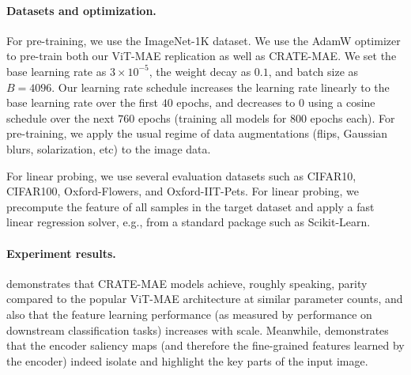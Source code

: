 \documentclass[\toplevelprefix/book-main.tex]{subfiles}
\begin{document}
\paragraph{Datasets and optimization.} For pre-training, we use the ImageNet-1K dataset. We use the AdamW optimizer to pre-train both our ViT-MAE replication as well as CRATE-MAE. We set the base learning rate as \(3 \times 10^{-5}\), the weight decay as \(0.1\), and batch size as \(B = 4096\). Our learning rate schedule increases the learning rate linearly to the base learning rate over the first \(40\) epochs, and decreases to \(0\) using a cosine schedule over the next \(760\) epochs (training all models for \(800\) epochs each). For pre-training, we apply the usual regime of data augmentations (flips, Gaussian blurs, solarization, etc) to the image data.

For linear probing, we use several evaluation datasets such as CIFAR10, CIFAR100, Oxford-Flowers, and Oxford-IIT-Pets. For linear probing, we precompute the feature of all samples in the target dataset and apply a fast linear regression solver, e.g., from a standard package such as Scikit-Learn.

\paragraph{Experiment results.}  demonstrates that CRATE-MAE models achieve, roughly speaking, parity compared to the popular ViT-MAE architecture at similar parameter counts, and also that the feature learning performance (as measured by performance on downstream classification tasks) increases with scale. Meanwhile,  demonstrates that the encoder saliency maps (and therefore the fine-grained features learned by the encoder) indeed isolate and highlight the key parts of the input image.
\end{document}
